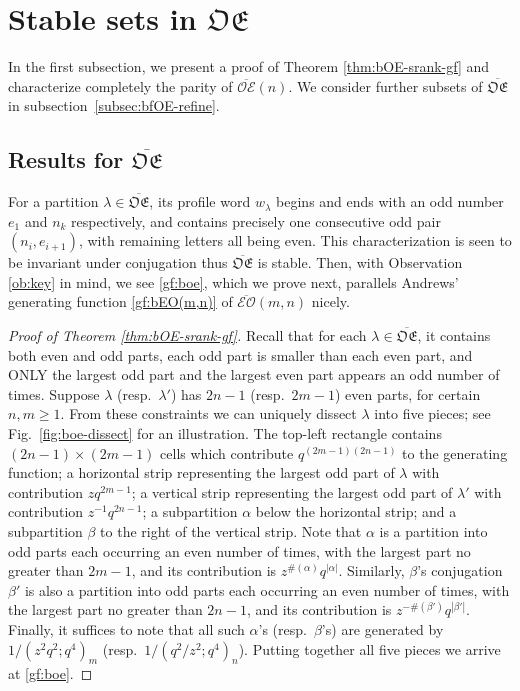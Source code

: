 \documentclass[12pt,reqno]{amsart}
\numberwithin{equation}{section}
\theoremstyle{plain}
\theoremstyle{definition}
\def\bOE{\overline{\mathcal{OE}}}
\def\bEO{\overline{\mathcal{EO}}}
\def\bfOE{\overline{\mathfrak{OE}}}
\begin{document}
\section{Stable sets in \texorpdfstring{$\mathfrak{OE}$}{OE}}\label{sec:OE}

In the first subsection, we present a proof of Theorem \ref{thm:bOE-srank-gf} and characterize completely the
parity of $\bOE(n)$. We consider further subsets of $\bfOE$ in subsection~\ref{subsec:bfOE-refine}.

\subsection{Results for \texorpdfstring{$\bfOE$}{overlined-OE}}\label{subsec:bfOE}

For a partition $\lambda\in\bfOE$, its profile word $w_{\lambda}$ begins and ends with an odd number $e_1$ and
$n_k$ respectively, and contains precisely one consecutive odd pair $(n_i,e_{i+1})$, with remaining letters all
being even. This characterization is seen to be invariant under conjugation thus $\bfOE$ is stable. Then, with
Observation \ref{ob:key} in mind, we see \eqref{gf:boe}, which we prove next, parallels Andrews' generating
function \eqref{gf:bEO(m,n)} of $\bEO(m,n)$ nicely.

\begin{proof}[Proof of Theorem \ref{thm:bOE-srank-gf}]
Recall that for each $\lambda\in\bfOE$, it contains both even and odd parts, each odd part is smaller than each
even part, and ONLY the largest odd part and the largest even part appears an odd number of times. Suppose
$\lambda$ (resp.~$\lambda'$) has $2n-1$ (resp.~$2m-1$) even parts, for certain $n,m\ge 1$. From these
constraints we can uniquely dissect $\lambda$ into five pieces; see Fig.~\ref{fig:boe-dissect} for an
illustration. The top-left rectangle contains $(2n-1)\times(2m-1)$ cells which contribute $q^{(2m-1)(2n-1)}$
to the generating function; a horizontal strip representing the largest odd part of $\lambda$ with contribution
$zq^{2m-1}$; a vertical strip representing the largest odd part of $\lambda'$ with contribution
$z^{-1}q^{2n-1}$; a subpartition $\alpha$ below the horizontal strip; and a subpartition $\beta$ to the right
of the vertical strip. Note that $\alpha$ is a partition into odd parts each occurring an even number of times,
with the largest part no greater than $2m-1$, and its contribution is $z^{\#(\alpha)}q^{|\alpha|}$. Similarly,
$\beta$'s conjugation $\beta'$ is also a partition into odd parts each occurring an even number of times, with
the largest part no greater than $2n-1$, and its contribution is $z^{-\#(\beta')}q^{|\beta'|}$. Finally, it
suffices to note that all such $\alpha$'s (resp.~$\beta$'s) are generated by $1/(z^2q^2;q^4)_m$
(resp.~$1/(q^2/z^2;q^4)_n$). Putting together all five pieces we arrive at \eqref{gf:boe}.
\end{proof}
\end{document}
